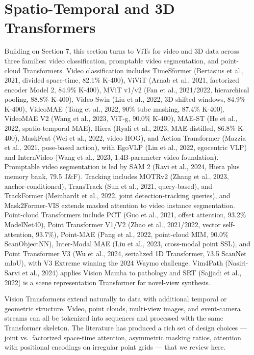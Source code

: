 \documentclass{article}
\begin{document}
\section{Spatio-Temporal and 3D Transformers}\label{spatio-temporal-and-3d-transformers}

Building on Section 7, this section turns to ViTs for video and 3D data across three families: video classification, promptable video segmentation, and point-cloud Transformers. Video classification includes TimeSformer (Bertasius et al., 2021, divided space-time, 82.1\% K-400), ViViT (Arnab et al., 2021, factorized encoder Model 2, 84.9\% K-400), MViT v1/v2 (Fan et al., 2021/2022, hierarchical pooling, 88.8\% K-400), Video Swin (Liu et al., 2022, 3D shifted windows, 84.9\% K-400), VideoMAE (Tong et al., 2022, 90\% tube masking, 87.4\% K-400), VideoMAE V2 (Wang et al., 2023, ViT-g, 90.0\% K-400), MAE-ST (He et al., 2022, spatio-temporal MAE), Hiera (Ryali et al., 2023, MAE-distilled, 86.8\% K-400), MaskFeat (Wei et al., 2022, video HOG), and Action Transformer (Mazzia et al., 2021, pose-based action), with EgoVLP (Lin et al., 2022, egocentric VLP) and InternVideo (Wang et al., 2023, 1.4B-parameter video foundation). Promptable video segmentation is led by SAM 2 (Ravi et al., 2024, Hiera plus memory bank, 79.5 J\&F). Tracking includes MOTRv2 (Zhang et al., 2023, anchor-conditioned), TransTrack (Sun et al., 2021, query-based), and TrackFormer (Meinhardt et al., 2022, joint detection-tracking queries), and Mask2Former-VIS \citep{cheng2021perpixelclassifica} extends masked attention to video instance segmentation. Point-cloud Transformers include PCT (Guo et al., 2021, offset attention, 93.2\% ModelNet40), Point Transformer V1/V2 (Zhao et al., 2021/2022, vector self-attention, 93.7\%), Point-MAE (Pang et al., 2022, point-cloud MIM, 90.0\% ScanObjectNN), Inter-Modal MAE (Liu et al., 2023, cross-modal point SSL), and Point Transformer V3 (Wu et al., 2024, serialized 1D Transformer, 73.5 ScanNet mIoU), with V3 Extreme winning the 2024 Waymo challenge. Vim4Path (Nasiri-Sarvi et al., 2024) applies Vision Mamba to pathology and SRT (Sajjadi et al., 2022) is a scene representation Transformer for novel-view synthesis.

Vision Transformers extend naturally to data with additional temporal or geometric structure. Video, point clouds, multi-view images, and event-camera streams can all be tokenized into sequences and processed with the same Transformer skeleton. The literature has produced a rich set of design choices --- joint vs.~factorized space-time attention, asymmetric masking ratios, attention with positional encodings on irregular point grids --- that we review here.
\end{document}
